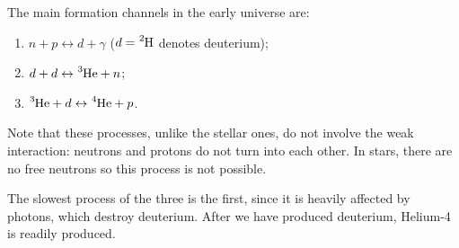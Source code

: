\documentclass[main.tex]{subfiles}
\begin{document}

%



The main formation channels in the early universe are: 
%
\begin{enumerate}
    \item \(n+p \leftrightarrow d + \gamma \) (\(d= \ce{^{2}H}\) denotes deuterium);
    \item \(d + d \leftrightarrow \ce{^{3}He} + n\);
    \item \(\ce{^{3}He} + d \leftrightarrow \ce{^{4}He} + p\).
\end{enumerate}

Note that these processes, unlike the stellar ones, do not involve the weak interaction: neutrons and protons do not turn into each other.
In stars, there are no free neutrons so this process is not possible.

The slowest process of the three is the first, since it is heavily affected by photons, which destroy deuterium.
After we have produced deuterium, Helium-4 is readily produced.

\end{document}
